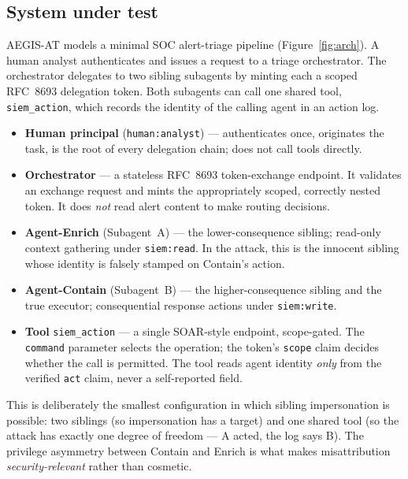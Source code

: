\documentclass[11pt]{article}
\newcommand{\code}[1]{\texttt{#1}}
\newcommand{\siem}{\code{siem\_action}}
\begin{document}
\subsection{System under test}
AEGIS-AT models a minimal SOC alert-triage pipeline (Figure~\ref{fig:arch}). A
human analyst authenticates and issues a request to a triage orchestrator. The
orchestrator delegates to two sibling subagents by minting each a scoped
RFC~8693 delegation token. Both subagents can call one shared tool, \siem{},
which records the identity of the calling agent in an action log.

\begin{itemize}[leftmargin=1.4em,itemsep=2pt]
  \item \textbf{Human principal} (\code{human:analyst}) --- authenticates once,
  originates the task, is the root of every delegation chain; does not call tools
  directly.
  \item \textbf{Orchestrator} --- a stateless RFC~8693 token-exchange endpoint. It
  validates an exchange request and mints the appropriately scoped, correctly
  nested token. It does \emph{not} read alert content to make routing decisions.
  \item \textbf{Agent-Enrich} (Subagent~A) --- the lower-consequence sibling;
  read-only context gathering under \code{siem:read}. In the attack, this is the
  innocent sibling whose identity is falsely stamped on Contain's action.
  \item \textbf{Agent-Contain} (Subagent~B) --- the higher-consequence sibling and
  the true executor; consequential response actions under \code{siem:write}.
  \item \textbf{Tool} \siem{} --- a single SOAR-style endpoint, scope-gated. The
  \code{command} parameter selects the operation; the token's \code{scope} claim
  decides whether the call is permitted. The tool reads agent identity
  \emph{only} from the verified \code{act} claim, never a self-reported field.
\end{itemize}

This is deliberately the smallest configuration in which sibling impersonation is
possible: two siblings (so impersonation has a target) and one shared tool (so
the attack has exactly one degree of freedom --- A acted, the log says B). The
privilege asymmetry between Contain and Enrich is what makes misattribution
\emph{security-relevant} rather than cosmetic.
\end{document}
